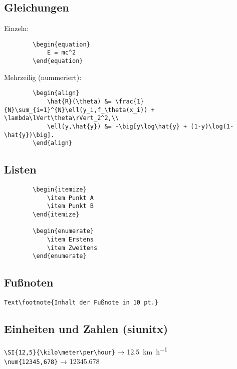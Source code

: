 \documentclass[11pt,a4paper]{article}
\begin{document}
    \subsection*{Gleichungen}
    Einzeln:
    \begin{verbatim}
        \begin{equation}
            E = mc^2
        \end{equation}
    \end{verbatim}

    Mehrzeilig (nummeriert):
    \begin{verbatim}
        \begin{align}
            \hat{R}(\theta) &= \frac{1}{N}\sum_{i=1}^{N}\ell(y_i,f_\theta(x_i)) + \lambda\lVert\theta\rVert_2^2,\\
            \ell(y,\hat{y}) &= -\big[y\log\hat{y} + (1-y)\log(1-\hat{y})\big].
        \end{align}
    \end{verbatim}

    \subsection*{Listen}
    \begin{verbatim}
        \begin{itemize}
            \item Punkt A
            \item Punkt B
        \end{itemize}

        \begin{enumerate}
            \item Erstens
            \item Zweitens
        \end{enumerate}
    \end{verbatim}

    \subsection*{Fußnoten}
    \verb|Text\footnote{Inhalt der Fußnote in 10 pt.}|

    \subsection*{Einheiten und Zahlen (siunitx)}
    \verb|\SI{12,5}{\kilo\meter\per\hour}| → \SI{12,5}{\kilo\meter\per\hour}\\
    \verb|\num{12345,678}| → \num{12345,678}
\end{document}
